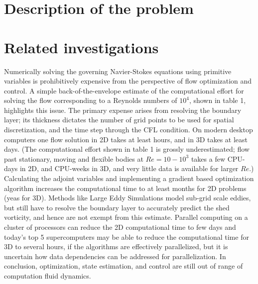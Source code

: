 




\section{Description of the problem}

\section{Related investigations}

Numerically solving the governing Navier-Stokes equations using primitive variables is prohibitively expensive from the perspective of flow optimization and control.
A simple back-of-the-envelope estimate of the computational effort for solving the flow corresponding to a Reynolds numbers of $10^4$, shown in table 1, highlights this issue.
The primary expense arises from resolving the boundary layer; its thickness dictates the number of grid points to be used for spatial discretization, and the time step through the CFL condition.
On modern desktop computers one flow solution in 2D takes at least hours, and in 3D takes at least days. (The computational effort shown in table 1 is grossly underestimated; flow past stationary, moving and flexible bodies at $Re = 10 - 10^3$ takes a few CPU-days in 2D, and CPU-weeks in 3D, and very little data is available for larger $Re$.)
Calculating the adjoint variables and implementing a gradient based optimization algorithm increases the computational time to at least months for 2D problems (yeas for 3D).
Methods like Large Eddy Simulations model sub-grid scale eddies, but still have to resolve the boundary layer to accurately predict the shed vorticity, and hence are not exempt from this estimate.
Parallel computing on a cluster of processors can reduce the 2D computational time to few days and today's top 5 supercomputers may be able to reduce the computational time for 3D to several hours, if the algorithms are effectively parallelized, but it is uncertain how data dependencies can be addressed for parallelization.
In conclusion, optimization, state estimation, and control are still out of range of computation fluid dynamics.

